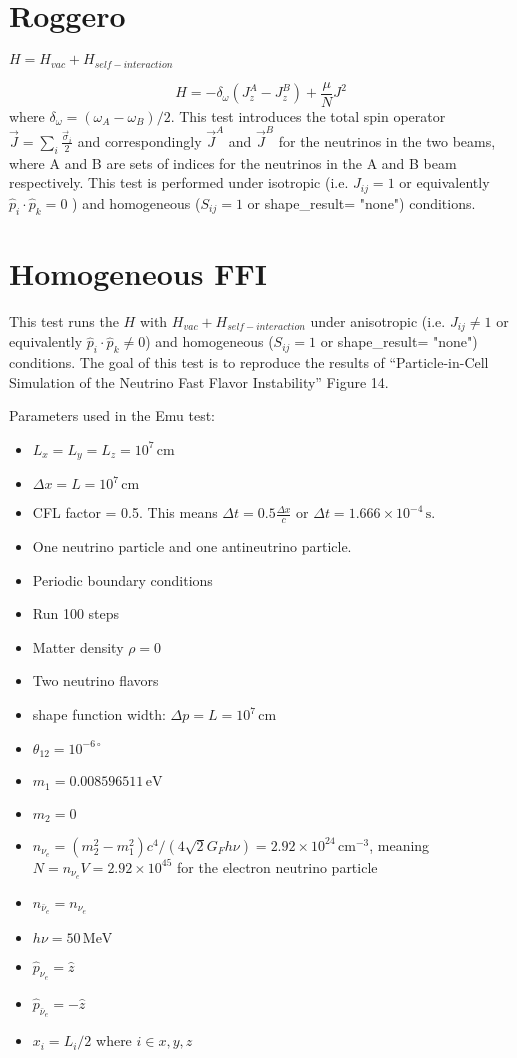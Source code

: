 \documentclass{article}
\begin{document}
\section{Roggero}
 \begin{center} $ H = H_{vac} + H_{self-interaction}$ \end{center} 
\begin{equation}
H = -\delta_{\omega} (J^A_z - J^B_z) + \frac{\mu}{N} J^2
\end{equation}
where $\delta_{\omega} = (\omega_A - \omega_B)/2 $. This test introduces the total spin operator \(\vec{J} = \sum_i \frac{\vec{\sigma}_i}{2}\) and correspondingly \(\vec{J}^A\) and \(\vec{J}^B\) for the neutrinos in the two beams, where A and B are sets of indices for the neutrinos in the A and B beam respectively. This test is performed under isotropic (i.e. $J_{ij}= 1$ or equivalently $\hat{p}_i \cdot \hat{p}_k = 0 $ ) and homogeneous ($S_{ij}= 1$ or shape\_result= "none") conditions. 
\section{Homogeneous FFI}
This test runs the $H$ with  $H_{vac} + H_{self-interaction} $ under anisotropic (i.e. $J_{ij}\neq 1$ or equivalently $\hat{p}_i \cdot \hat{p}_k \neq 0 $) and homogeneous ($S_{ij}= 1$ or shape\_result= "none") conditions. The goal of this test is to reproduce the results of ``Particle-in-Cell Simulation of the Neutrino Fast Flavor Instability'' Figure 14.

Parameters used in the Emu test:
\begin{itemize}
\item $L_x=L_y=L_z=10^7\,\mathrm{cm}$
\item $\Delta x = L = 10^7\,\mathrm{cm} $
\item CFL factor = 0.5. This means $\Delta t = 0.5 \frac{\Delta x}{c}$ or $\Delta t = 1.666 \times10^{-4}\,\mathrm{s}$.
\item One neutrino particle and one antineutrino particle.
\item Periodic boundary conditions
\item Run 100 steps
\item Matter density $\rho=0$
\item Two neutrino flavors
\item shape function width: $\Delta p=L=10^7\,\mathrm{cm}$
\item $\theta_{12}=10^{-6 \circ}$
\item $m_1 = 0.008596511\,\mathrm{eV}$
\item $m_2 = 0$
\item $n_{\nu_e}=(m_2^2-m_1^2) c^4/ (4 \sqrt{2} G_F h\nu)=2.92 \times10^{24}\,\mathrm{cm}^{-3}$, meaning $N=n_{\nu_e}V=2.92\times10^{45}$ for the electron neutrino particle
\item $n_{\bar{\nu}_e} = n_{\nu_e}$
\item $h\nu=50\,\mathrm{MeV}$
\item $\hat{p}_{\nu_e} = \hat{z}$
\item $\hat{p}_{\bar{\nu}_e} = -\hat{z}$
\item $x_i = L_i/2$ where $i\in{x,y,z}$
\end{itemize}
\end{document}
